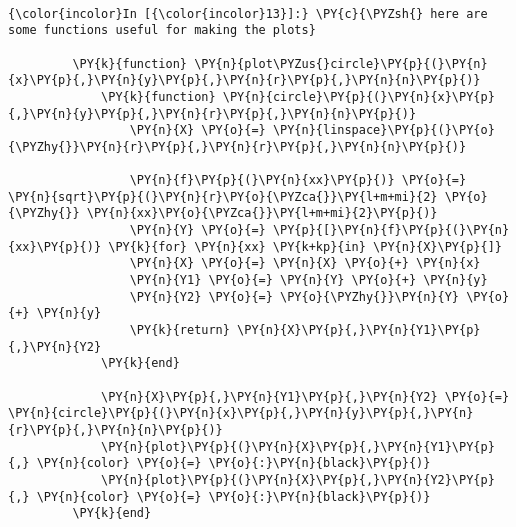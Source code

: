     \begin{center}
    \end{center}
    { \hspace*{\fill} \\}
    
    \begin{Verbatim}[commandchars=\\\{\}]
{\color{incolor}In [{\color{incolor}13}]:} \PY{c}{\PYZsh{} here are some functions useful for making the plots}
         
         \PY{k}{function} \PY{n}{plot\PYZus{}circle}\PY{p}{(}\PY{n}{x}\PY{p}{,}\PY{n}{y}\PY{p}{,}\PY{n}{r}\PY{p}{,}\PY{n}{n}\PY{p}{)}
             \PY{k}{function} \PY{n}{circle}\PY{p}{(}\PY{n}{x}\PY{p}{,}\PY{n}{y}\PY{p}{,}\PY{n}{r}\PY{p}{,}\PY{n}{n}\PY{p}{)}
                 \PY{n}{X} \PY{o}{=} \PY{n}{linspace}\PY{p}{(}\PY{o}{\PYZhy{}}\PY{n}{r}\PY{p}{,}\PY{n}{r}\PY{p}{,}\PY{n}{n}\PY{p}{)}
         
                 \PY{n}{f}\PY{p}{(}\PY{n}{xx}\PY{p}{)} \PY{o}{=} \PY{n}{sqrt}\PY{p}{(}\PY{n}{r}\PY{o}{\PYZca{}}\PY{l+m+mi}{2} \PY{o}{\PYZhy{}} \PY{n}{xx}\PY{o}{\PYZca{}}\PY{l+m+mi}{2}\PY{p}{)}
                 \PY{n}{Y} \PY{o}{=} \PY{p}{[}\PY{n}{f}\PY{p}{(}\PY{n}{xx}\PY{p}{)} \PY{k}{for} \PY{n}{xx} \PY{k+kp}{in} \PY{n}{X}\PY{p}{]}
                 \PY{n}{X} \PY{o}{=} \PY{n}{X} \PY{o}{+} \PY{n}{x}
                 \PY{n}{Y1} \PY{o}{=} \PY{n}{Y} \PY{o}{+} \PY{n}{y}
                 \PY{n}{Y2} \PY{o}{=} \PY{o}{\PYZhy{}}\PY{n}{Y} \PY{o}{+} \PY{n}{y}
                 \PY{k}{return} \PY{n}{X}\PY{p}{,}\PY{n}{Y1}\PY{p}{,}\PY{n}{Y2}
             \PY{k}{end}
         
             \PY{n}{X}\PY{p}{,}\PY{n}{Y1}\PY{p}{,}\PY{n}{Y2} \PY{o}{=} \PY{n}{circle}\PY{p}{(}\PY{n}{x}\PY{p}{,}\PY{n}{y}\PY{p}{,}\PY{n}{r}\PY{p}{,}\PY{n}{n}\PY{p}{)}
             \PY{n}{plot}\PY{p}{(}\PY{n}{X}\PY{p}{,}\PY{n}{Y1}\PY{p}{,} \PY{n}{color} \PY{o}{=} \PY{o}{:}\PY{n}{black}\PY{p}{)}
             \PY{n}{plot}\PY{p}{(}\PY{n}{X}\PY{p}{,}\PY{n}{Y2}\PY{p}{,} \PY{n}{color} \PY{o}{=} \PY{o}{:}\PY{n}{black}\PY{p}{)}
         \PY{k}{end}
         

\end{Verbatim}
